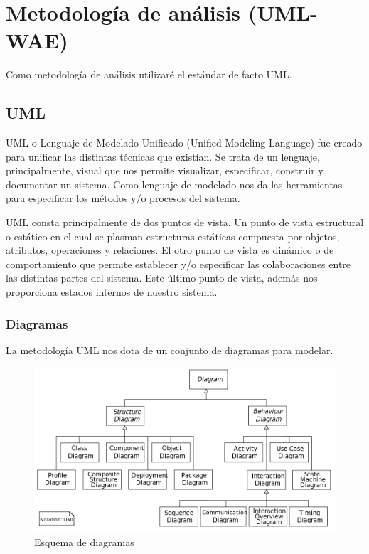 
\section{Metodología de análisis (UML-WAE)}
Como metodología de análisis utilizaré el estándar de facto UML.

\subsection{UML}
UML o Lenguaje de Modelado Unificado (Unified Modeling Language) fue creado para unificar las distintas técnicas que existían. Se trata de un lenguaje, principalmente, visual que nos permite visualizar, especificar, construir y documentar un sistema. Como lenguaje de modelado nos da las herramientas para especificar los métodos y/o procesos del sistema.

UML consta principalmente de dos puntos de vista. Un punto de vista estructural o estático en el cual se plasman estructuras estáticas compuesta por objetos, atributos, operaciones y relaciones. El otro punto de vista es dinámico o de comportamiento que permite establecer y/o especificar las colaboraciones entre las distintas partes del sistema. Este último punto de vista, además nos proporciona estados internos de nuestro sistema.

\subsubsection{Diagramas}
La metodología UML nos dota de un conjunto de diagramas para modelar.

\begin{figure}[htbp]
\centering
\includegraphics[width=\textwidth]{imagenes/diagramas}
\caption{Esquema de diagramas}
\label{fig:diagramas}
\end{figure}


